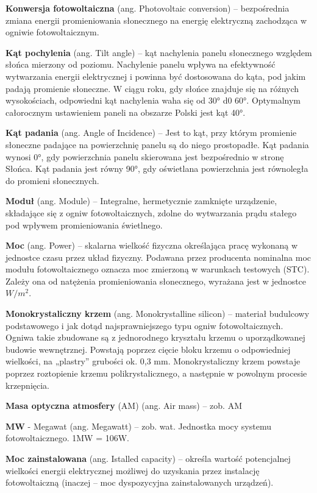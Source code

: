 \documentclass[12pt,a4paper]{article}
\begin{document}
\textbf{Konwersja fotowoltaiczna} (ang. Photovoltaic conversion)  – bezpośrednia zmiana energii promieniowania słonecznego na energię elektryczną zachodząca w ogniwie fotowoltaicznym.

\textbf{Kąt pochylenia} (ang. Tilt angle) – kąt nachylenia panelu słonecznego względem słońca mierzony od poziomu. Nachylenie panelu wpływa na efektywność wytwarzania energii elektrycznej i powinna być dostosowana do kąta, pod jakim padają promienie słoneczne. W ciągu roku, gdy słońce znajduje się na różnych wysokościach, odpowiedni kąt nachylenia waha się od 30° d0 60°. Optymalnym całorocznym ustawieniem paneli na obszarze Polski jest kąt 40°.

\textbf{Kąt padania} (ang. Angle of Incidence) – Jest to kąt, przy którym promienie słoneczne padające na powierzchnię panelu są do niego prostopadłe. Kąt padania wynosi 0°, gdy powierzchnia panelu skierowana jest bezpośrednio w stronę Słońca. Kąt padania jest równy 90°, gdy oświetlana powierzchnia jest równoległa do promieni słonecznych.

\textbf{Moduł} (ang. Module) – Integralne, hermetycznie zamknięte urządzenie, składające się z ogniw fotowoltaicznych, zdolne do wytwarzania prądu stałego pod wpływem promieniowania świetlnego.

\textbf{Moc} (ang. Power) – skalarna wielkość fizyczna określająca pracę wykonaną w jednostce czasu przez układ fizyczny. Podawana przez producenta nominalna moc modułu fotowoltaicznego oznacza moc zmierzoną w warunkach testowych (STC). Zależy ona od natężenia promieniowania słonecznego, wyrażana jest w jednostce ${W/m^{2}}$.

\textbf{Monokrystaliczny krzem} (ang. Monokrystalline silicon) – materiał budulcowy podstawowego i jak dotąd najsprawniejszego typu ogniw fotowoltaicznych. Ogniwa takie zbudowane są z jednorodnego kryształu krzemu o uporządkowanej budowie wewnętrznej. Powstają poprzez cięcie bloku krzemu o odpowiedniej wielkości, na „plastry” grubości ok. 0,3 mm. Monokrystaliczny krzem powstaje poprzez roztopienie krzemu polikrystalicznego, a następnie w powolnym procesie krzepnięcia.

\textbf{Masa optyczna atmosfery} (AM) (ang. Air mass) – zob. AM

\textbf{MW} - Megawat (ang. Megawatt) – zob. wat. Jednostka mocy systemu fotowoltaicznego. 1MW = 106W.

\textbf{Moc zainstalowana} (ang. Istalled capacity) – określa wartość potencjalnej wielkości energii elektrycznej możliwej do uzyskania przez instalację fotowoltaiczną (inaczej – moc dyspozycyjna zainstalowanych urządzeń).
\end{document}
